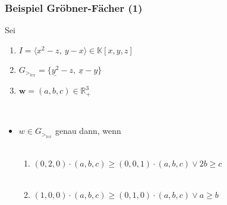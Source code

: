 \documentclass{beamer}
\begin{document}
\begin{frame}[fragile]
\frametitle{Beispiel Gröbner-Fächer (1)}
 Sei 
 \begin{enumerate}
 \item $I = \langle x^{2}-z,~y-x  \rangle \in \mathbb{K}\left[x,y,z\right]  $
 \item $G_{>_{lex}} = \{ \underline{y^{2}}-z,~\underline{x}-y  \} $ 
 \item $\textbf{w}= (a,b,c) \in \mathbb{R}^{3}_{+} $
\end{enumerate}
 
~\\
\begin{itemize}
\item $w \in G_{>_{lex}}$ genau dann, wenn 
~\\
~\\
\begin{enumerate}
\item $\left(0,2,0\right) \cdot \left(a,b,c\right) \geq \left(0,0,1\right) \cdot \left(a,b,c\right) \vee 2b \geq c  $
~\\
~\\
\item $\left(1,0,0\right) \cdot \left(a,b,c\right) \geq \left(0,1,0\right) \cdot \left(a,b,c\right) \vee a \geq b $ 
\end{enumerate}
\end{itemize}

\end{frame}
\end{document}
